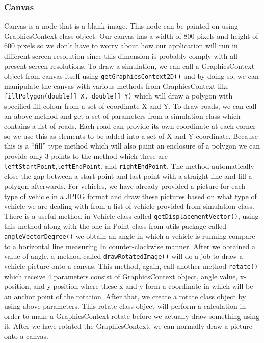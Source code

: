 \documentclass[11pt]{article}
\begin{document}
\subsubsection{Canvas}
Canvas is a node that is a blank image. This node can be painted on using GraphicsContext class object. Our canvas has a width of 800 pixels and height of 600 pixels so we don’t have to worry about how our application will run in different screen resolution since this dimension is probably comply with all present screen resolutions. To draw a simulation, we can call a GraphicsContext object from canvas itself using \texttt{getGraphicsContext2D()} and by doing so, we can manipulate the canvas with various methods from GraphicsContext like \texttt{fillPolygon(double[] X, double[] Y)} which will draw a polygon with specified fill colour from a set of coordinate X and Y. To draw roads, we can call an above method and get a set of parameters from a simulation class which contains a list of roads. Each road can provide its own coordinate at each corner so we use this as elements to be added into a set of X and Y coordinate. Because this is a “fill” type method which will also paint an enclosure of a polygon we can provide only 3 points to the method which these are \texttt{leftStartPoint},\texttt{leftEndPoint}, and \texttt{rightEndPoint}. The method automatically close the gap between a start point and last point with a straight line and fill a polygon afterwards. For vehicles, we have already provided a picture for each type of vehicle in a JPEG format and draw these pictures based on what type of vehicle we are dealing with from a list of vehicle provided from simulation class. There is a useful method in Vehicle class called \texttt{getDisplacementVector()}, using this method along with the one in Point class from utils package called \texttt{angleVectorDegree()} we obtain an angle in which a vehicle is running compare to a horizontal line measuring In counter-clockwise manner. After we obtained a value of angle, a method called \texttt{drawRotatedImage()} will do a job to draw a vehicle picture onto a canvas. This method, again, call another method \texttt{rotate()} which receive 4 parameters consist of GraphicsContext object, angle value, x-position, and y-position where these x and y form a coordinate in which will be an anchor point of the rotation. After that, we create a rotate class object by using above parameters. This rotate class object will perform a calculation in order to make a GraphicsContext rotate before we actually draw something using it. After we have rotated the GraphicsContext, we can normally draw a picture onto a canvas.
\end{document}
